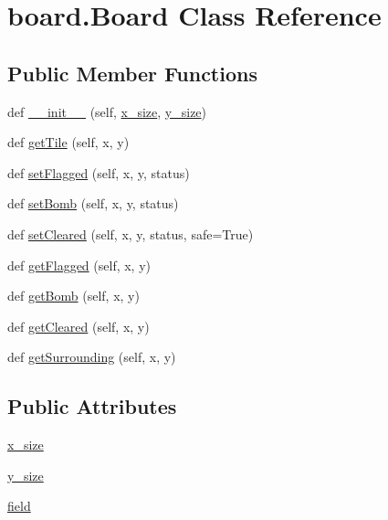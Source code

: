 \hypertarget{classboard_1_1_board}{}\section{board.\+Board Class Reference}
\label{classboard_1_1_board}
\subsection*{Public Member Functions}
\begin{DoxyCompactItemize}
\item 
def \mbox{\hyperlink{classboard_1_1_board_a9a83d6d877f51e6d7b6a30c2b17cf321}{\+\_\+\+\_\+init\+\_\+\+\_\+}} (self, \mbox{\hyperlink{classboard_1_1_board_a7fed89e2d304ae0a8e3579279e3fdf13}{x\+\_\+size}}, \mbox{\hyperlink{classboard_1_1_board_a753e98035a83120eb1aa26c227a53c9b}{y\+\_\+size}})
\item 
def \mbox{\hyperlink{classboard_1_1_board_afceaa19167d36a8b6a80da6647e1a3c5}{get\+Tile}} (self, x, y)
\item 
def \mbox{\hyperlink{classboard_1_1_board_aa873286b9859c0a13f446f776fa7b125}{set\+Flagged}} (self, x, y, status)
\item 
def \mbox{\hyperlink{classboard_1_1_board_a44ed72c4fc9f25109c0b1fc4478c9f49}{set\+Bomb}} (self, x, y, status)
\item 
def \mbox{\hyperlink{classboard_1_1_board_ae82ac3a91638d8a76ad52e8ba83a60b7}{set\+Cleared}} (self, x, y, status, safe=True)
\item 
def \mbox{\hyperlink{classboard_1_1_board_a1e824cb6d46a2c1cb1e142436b3d012f}{get\+Flagged}} (self, x, y)
\item 
def \mbox{\hyperlink{classboard_1_1_board_ab8f21f26a453a5ef383a0dc91256a598}{get\+Bomb}} (self, x, y)
\item 
def \mbox{\hyperlink{classboard_1_1_board_a06cacb801d5880d3267ed1aea0486072}{get\+Cleared}} (self, x, y)
\item 
def \mbox{\hyperlink{classboard_1_1_board_aa3453607b9850fa2a074ee7595a332f2}{get\+Surrounding}} (self, x, y)
\end{DoxyCompactItemize}
\subsection*{Public Attributes}
\begin{DoxyCompactItemize}
\item 
\mbox{\hyperlink{classboard_1_1_board_a7fed89e2d304ae0a8e3579279e3fdf13}{x\+\_\+size}}
\item 
\mbox{\hyperlink{classboard_1_1_board_a753e98035a83120eb1aa26c227a53c9b}{y\+\_\+size}}
\item 
\mbox{\hyperlink{classboard_1_1_board_aba360fdddf89e1cc92bfd0dc98233b74}{field}}
\end{DoxyCompactItemize}


